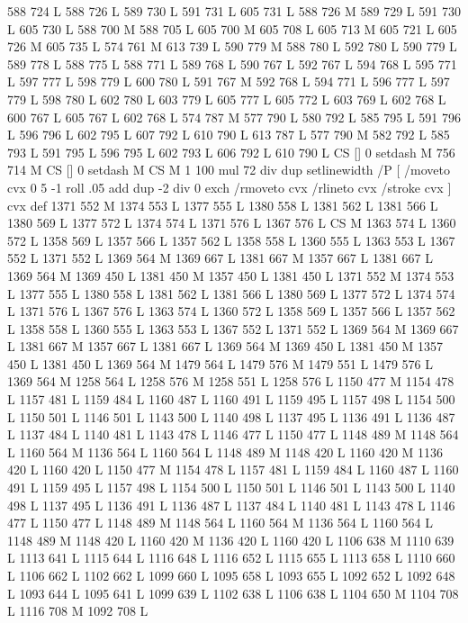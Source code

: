 {{{{{{{{{{{{{{{{{{588 724 L
588 726 L
589 730 L
591 731 L
605 731 L
588 726 M 589 729 L
591 730 L
605 730 L
588 700 M 588 705 L
605 700 M 605 708 L
605 713 M 605 721 L
605 726 M 605 735 L
574 761 M 613 739 L
590 779 M 588 780 L
592 780 L
590 779 L
589 778 L
588 775 L
588 771 L
589 768 L
590 767 L
592 767 L
594 768 L
595 771 L
597 777 L
598 779 L
600 780 L
591 767 M 592 768 L
594 771 L
596 777 L
597 779 L
598 780 L
602 780 L
603 779 L
605 777 L
605 772 L
603 769 L
602 768 L
600 767 L
605 767 L
602 768 L
574 787 M 577 790 L
580 792 L
585 795 L
591 796 L
596 796 L
602 795 L
607 792 L
610 790 L
613 787 L
577 790 M 582 792 L
585 793 L
591 795 L
596 795 L
602 793 L
606 792 L
610 790 L
CS [] 0 setdash M
756 714 M CS [] 0 setdash M
CS M 1 100 mul 72 div dup setlinewidth
/P [ /moveto cvx 0 5 -1 roll .05 add dup -2 div 0 exch /rmoveto cvx /rlineto cvx /stroke cvx ] cvx def
1371 552 M 1374 553 L
1377 555 L
1380 558 L
1381 562 L
1381 566 L
1380 569 L
1377 572 L
1374 574 L
1371 576 L
1367 576 L
CS M
1363 574 L
1360 572 L
1358 569 L
1357 566 L
1357 562 L
1358 558 L
1360 555 L
1363 553 L
1367 552 L
1371 552 L
1369 564 M 1369 667 L
1381 667 M 1357 667 L
1381 667 L
1369 564 M 1369 450 L
1381 450 M 1357 450 L
1381 450 L
1371 552 M 1374 553 L
1377 555 L
1380 558 L
1381 562 L
1381 566 L
1380 569 L
1377 572 L
1374 574 L
1371 576 L
1367 576 L
1363 574 L
1360 572 L
1358 569 L
1357 566 L
1357 562 L
1358 558 L
1360 555 L
1363 553 L
1367 552 L
1371 552 L
1369 564 M 1369 667 L
1381 667 M 1357 667 L
1381 667 L
1369 564 M 1369 450 L
1381 450 M 1357 450 L
1381 450 L
1369 564 M 1479 564 L
1479 576 M 1479 551 L
1479 576 L
1369 564 M 1258 564 L
1258 576 M 1258 551 L
1258 576 L
1150 477 M 1154 478 L
1157 481 L
1159 484 L
1160 487 L
1160 491 L
1159 495 L
1157 498 L
1154 500 L
1150 501 L
1146 501 L
1143 500 L
1140 498 L
1137 495 L
1136 491 L
1136 487 L
1137 484 L
1140 481 L
1143 478 L
1146 477 L
1150 477 L
1148 489 M 1148 564 L
1160 564 M 1136 564 L
1160 564 L
1148 489 M 1148 420 L
1160 420 M 1136 420 L
1160 420 L
1150 477 M 1154 478 L
1157 481 L
1159 484 L
1160 487 L
1160 491 L
1159 495 L
1157 498 L
1154 500 L
1150 501 L
1146 501 L
1143 500 L
1140 498 L
1137 495 L
1136 491 L
1136 487 L
1137 484 L
1140 481 L
1143 478 L
1146 477 L
1150 477 L
1148 489 M 1148 564 L
1160 564 M 1136 564 L
1160 564 L
1148 489 M 1148 420 L
1160 420 M 1136 420 L
1160 420 L
1106 638 M 1110 639 L
1113 641 L
1115 644 L
1116 648 L
1116 652 L
1115 655 L
1113 658 L
1110 660 L
1106 662 L
1102 662 L
1099 660 L
1095 658 L
1093 655 L
1092 652 L
1092 648 L
1093 644 L
1095 641 L
1099 639 L
1102 638 L
1106 638 L
1104 650 M 1104 708 L
1116 708 M 1092 708 L
}}}}}}}}}}}}}}}}}}

